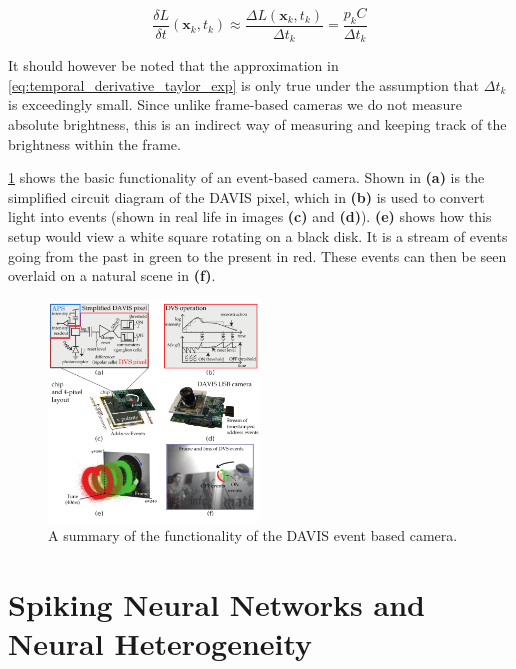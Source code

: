 \begin{equation}
      \frac{\delta L}{\delta t}(\boldsymbol{\mathbf{x}}_k, t_k) \approx \frac{\Delta L(\boldsymbol{\mathbf{x}}_k, t_k)}{\Delta t_k} = \frac{p_k C}{\Delta t_k}
      \label{eq:temporal_derivative}
\end{equation}

It should however be noted that the approximation in \cref{eq:temporal_derivative_taylor_exp} is only true under the assumption that $ \Delta t_k $ is exceedingly small. Since unlike frame-based cameras we do not measure absolute brightness, this is an indirect way of measuring and keeping track of the brightness within the frame.

\cref{fig:davis_camera} shows the basic functionality of an event-based camera. Shown in \textbf{(a)} is the simplified circuit diagram of the DAVIS pixel, which in \textbf{(b)} is used to convert light into events (shown in real life in images \textbf{(c)} and \textbf{(d)}). \textbf{(e)} shows how this setup would view a white square rotating on a black disk. It is a stream of events going from the past in green to the present in red. These events can then be seen overlaid on a natural scene in \textbf{(f)}.

\begin{figure}[htb]
      \centering
      \includegraphics[width=0.5\textwidth]{background/images/davis_camera.png}
      \caption{A summary of the functionality of the DAVIS event based camera\cite{EventBasedVisionASurvery}.}
      \label{fig:davis_camera}
\end{figure}

\section{Spiking Neural Networks and Neural Heterogeneity} \label{ssec:snn_and_heterogeneity}

